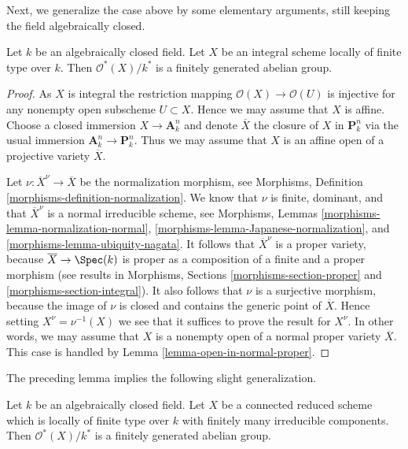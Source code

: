 \noindent
Next, we generalize the case above by some elementary arguments, still
keeping the field algebraically closed.

\begin{lemma}
\label{lemma-units-integral-finite-type-algebraically-closed}
Let $k$ be an algebraically closed field.
Let $X$ be an integral scheme locally of finite type over $k$.
Then $\mathcal{O}^*(X)/k^*$ is a finitely generated abelian group.
\end{lemma}

\begin{proof}
As $X$ is integral the restriction mapping
$\mathcal{O}(X) \to \mathcal{O}(U)$ is injective for any
nonempty open subscheme $U \subset X$. Hence we may assume
that $X$ is affine. Choose a closed immersion
$X \to \mathbf{A}^n_k$
and denote $\overline{X}$ the closure of $X$ in $\mathbf{P}^n_k$
via the usual immersion $\mathbf{A}^n_k \to \mathbf{P}^n_k$.
Thus we may assume that $X$ is an affine open of a projective
variety $\overline{X}$.

\medskip\noindent
Let $\nu : \overline{X}^\nu \to \overline{X}$ be the normalization
morphism, see
Morphisms, Definition \ref{morphisms-definition-normalization}.
We know that $\nu$ is finite, dominant, and that $\overline{X}^\nu$
is a normal irreducible scheme, see
Morphisms, Lemmas \ref{morphisms-lemma-normalization-normal},
\ref{morphisms-lemma-Japanese-normalization}, and
\ref{morphisms-lemma-ubiquity-nagata}.
It follows that $\overline{X}^\nu$ is a proper variety,
because $\overline{X} \to \Spec(k)$ is proper as a composition
of a finite and a proper morphism (see results in
Morphisms, Sections \ref{morphisms-section-proper} and
\ref{morphisms-section-integral}).
It also follows that $\nu$ is a surjective morphism, because
the image of $\nu$ is closed and contains the generic point of $\overline{X}$.
Hence setting $X^\nu = \nu^{-1}(X)$ we see that it suffices to prove the
result for $X^\nu$. In other words, we may assume that $X$ is a nonempty
open of a normal proper variety $\overline{X}$. This case is handled by
Lemma \ref{lemma-open-in-normal-proper}.
\end{proof}

\noindent
The preceding lemma implies the following slight generalization.

\begin{lemma}
\label{lemma-units-general-algebraically-closed}
Let $k$ be an algebraically closed field.
Let $X$ be a connected reduced scheme which is locally of finite type
over $k$ with finitely many irreducible components.
Then $\mathcal{O}^*(X)/k^*$ is a finitely generated abelian group.
\end{lemma}

